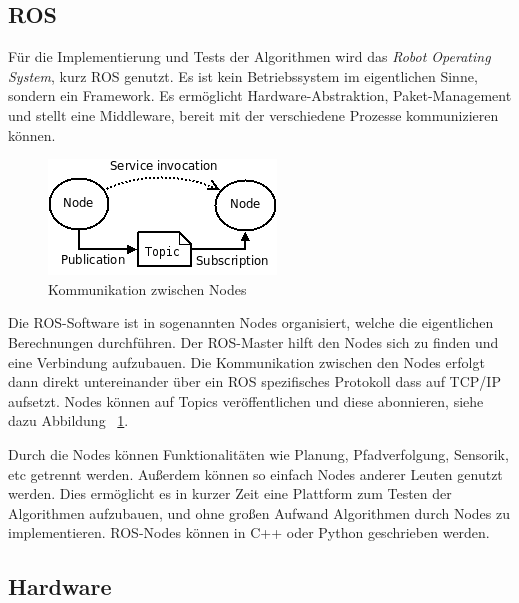 \documentclass[11pt,a4paper]{article}
\begin{document}
{\subsection{ROS}

	F\"ur die Implementierung und Tests der Algorithmen wird das \textit{Robot Operating System}, kurz ROS genutzt. Es ist kein Betriebssystem im eigentlichen Sinne, sondern ein Framework. Es erm\"oglicht Hardware-Abstraktion, Paket-Management und stellt eine Middleware, bereit mit der verschiedene Prozesse kommunizieren k\"onnen. \cite{rosWiki}

	\begin{figure}[h]
		\includegraphics[width=\linewidth]{pictures/ROS_basic_concepts.png}
		\caption{Kommunikation zwischen Nodes \label{fig:rosNodes}}
	\end{figure}

	Die ROS-Software ist in sogenannten Nodes organisiert, welche die eigentlichen Berechnungen durchf\"uhren. Der ROS-Master hilft den Nodes sich zu finden und eine Verbindung aufzubauen. Die Kommunikation zwischen den Nodes erfolgt dann direkt untereinander \"uber ein ROS spezifisches Protokoll dass auf TCP/IP aufsetzt. Nodes k\"onnen auf Topics ver\"offentlichen und diese abonnieren, siehe dazu Abbildung ~\ref{fig:rosNodes}. \cite{rosConcepts}


	Durch die Nodes k\"onnen Funktionalit\"aten wie Planung, Pfadverfolgung, Sensorik, etc getrennt werden. Au{\ss}erdem k\"onnen so einfach Nodes anderer Leuten genutzt werden. Dies erm\"oglicht es in kurzer Zeit eine Plattform zum Testen der Algorithmen aufzubauen, und ohne gro{\ss}en Aufwand Algorithmen durch Nodes zu implementieren. ROS-Nodes k\"onnen in C++ oder Python geschrieben werden.

\subsection{Hardware}
 
}
\end{document}

